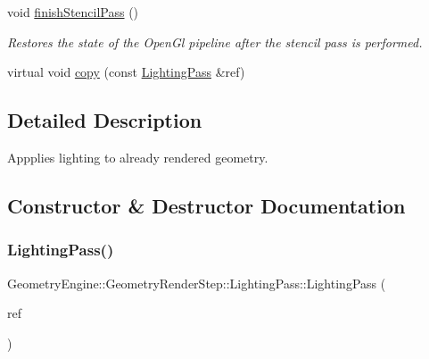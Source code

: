 \begin{DoxyCompactItemize}
\mbox{\label{class_geometry_engine_1_1_geometry_render_step_1_1_lighting_pass_aa809dc069c363993224df44cf44842bb}} 
void \mbox{\hyperlink{class_geometry_engine_1_1_geometry_render_step_1_1_lighting_pass_aa809dc069c363993224df44cf44842bb}{finish\+Stencil\+Pass}} ()
\begin{DoxyCompactList}\small\item\em Restores the state of the Open\+Gl pipeline after the stencil pass is performed. \end{DoxyCompactList}\item 
virtual void \mbox{\hyperlink{class_geometry_engine_1_1_geometry_render_step_1_1_lighting_pass_a4865616b03a872033a6f9abc5c370374}{copy}} (const \mbox{\hyperlink{class_geometry_engine_1_1_geometry_render_step_1_1_lighting_pass}{Lighting\+Pass}} \&ref)
\end{DoxyCompactItemize}


\subsection{Detailed Description}
Appplies lighting to already rendered geometry. 

\subsection{Constructor \& Destructor Documentation}
\mbox{\label{class_geometry_engine_1_1_geometry_render_step_1_1_lighting_pass_ab25f4db452340113c3ace2ab6994bd9f}} 
\subsubsection{\texorpdfstring{LightingPass()}{LightingPass()}}
{\footnotesize\ttfamily Geometry\+Engine\+::\+Geometry\+Render\+Step\+::\+Lighting\+Pass\+::\+Lighting\+Pass (\begin{DoxyParamCaption}\item[{const \mbox{\hyperlink{class_geometry_engine_1_1_geometry_render_step_1_1_lighting_pass}{Lighting\+Pass}} \&}]{ref }\end{DoxyParamCaption})\hspace{0.3cm}{\ttfamily [inline]}}

